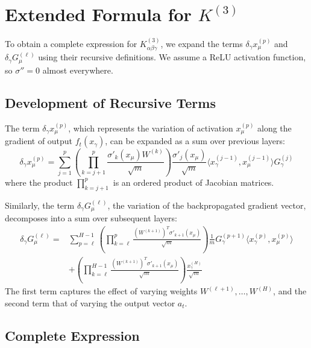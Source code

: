 \documentclass[a4paper]{article}
\begin{document}
\section{Extended Formula for $K^{(3)}$}

To obtain a complete expression for $K^{(3)}_{\alpha\beta\gamma}$, we expand the terms $\delta_\gamma x^{(p)}_\mu$ and $\delta_\gamma G^{(\ell)}_\mu$ using their recursive definitions. We assume a ReLU activation function, so $\sigma''=0$ almost everywhere.

\subsection{Development of Recursive Terms}

The term $\delta_\gamma x^{(p)}_\mu$, which represents the variation of activation $x^{(p)}_\mu$ along the gradient of output $f_t(x_\gamma)$, can be expanded as a sum over previous layers:
\begin{equation}
\delta_\gamma x^{(p)}_\mu = \sum_{j=1}^{p} \left( \prod_{k=j+1}^{p} \frac{\sigma'_{k}(x_\mu) W^{(k)}}{\sqrt{m}} \right) \frac{\sigma'_{j}(x_\mu)}{\sqrt{m}} \langle x^{(j-1)}_\gamma, x^{(j-1)}_\mu \rangle G^{(j)}_\gamma
\end{equation}
where the product $\prod_{k=j+1}^{p}$ is an ordered product of Jacobian matrices.

Similarly, the term $\delta_\gamma G^{(\ell)}_\mu$, the variation of the backpropagated gradient vector, decomposes into a sum over subsequent layers:
\begin{align}
\delta_\gamma G^{(\ell)}_\mu = & \sum_{p=\ell}^{H-1} \left( \prod_{k=\ell}^{p} \frac{(W^{(k+1)})^T \sigma'_{k+1}(x_\mu)}{\sqrt{m}} \right) \frac{1}{m} G^{(p+1)}_\gamma \langle x^{(p)}_\gamma, x^{(p)}_\mu \rangle \\
& + \left( \prod_{k=\ell}^{H-1} \frac{(W^{(k+1)})^T \sigma'_{k+1}(x_\mu)}{\sqrt{m}} \right) \frac{x^{(H)}_\gamma}{\sqrt{m}}
\end{align}
The first term captures the effect of varying weights $W^{(\ell+1)}, \dots, W^{(H)}$, and the second term that of varying the output vector $a_t$.

\subsection{Complete Expression}
\end{document}
